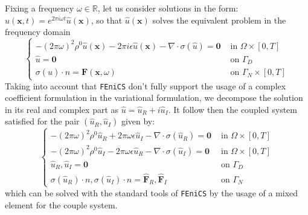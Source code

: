 Fixing a frequency $\omega \in \mathbb{R}$, let us consider solutions in the form: $u(\mathbf{x},t) = e^{2 \pi i \omega t}\hat{u}(\mathbf{x})$, so that $\hat{u}(\mathbf{x})$ solves the equivalent problem in the frequency domain
\begin{equation*}
    \left \{
    \begin{array}{ccc}
        -(2\pi \omega)^2 \rho^0 \hat{u}(\mathbf{x}) - 2 \pi i \epsilon \hat{u}(\mathbf{x}) - \nabla \cdot \sigma(\hat{u}) = \mathbf{0} & \text{ in } \Omega \times [0,T] \\
        \hat{u} = \mathbf{0} & \text{ on } \Gamma_D\\
        \sigma(\hat{u}) \cdot n = \mathbf{F}(\mathbf{x}, \omega) & \text{ on }\Gamma_N \times [0,T]
    \end{array}
    \right .
\end{equation*}
Taking into account that \texttt{FEniCS} don't fully support the usage of a complex coefficient formulation in the variational formulation, we decompose the solution in its real and complex part as $\hat{u} = \hat{u}_R + i \hat{u}_I$. It follow then the coupled system satisfied for the pair $(\hat{u}_R, \hat{u}_I)$ given by:
\begin{equation*}
    \left \{
    \begin{array}{cc}
        -(2\pi \omega)^2 \rho^0 \hat{u}_R + 2\pi \omega \epsilon \hat{u}_I - \nabla \cdot \sigma (\hat{u}_R) = \mathbf{0} & \text{ in }\Omega \times [0,T] \\
        -(2\pi \omega)^2 \rho^0 \hat{u}_I - 2\pi \omega \epsilon \hat{u}_R - \nabla \cdot \sigma (\hat{u}_I) = \mathbf{0} & \text{ in }\Omega \times [0, T] \\
        \hat{u}_R, \hat{u}_I = \mathbf{0} & \text{ on } \Gamma_D \\
        \sigma(\hat{u}_R)\cdot n, \sigma(\hat{u}_I)\cdot n = \hat{\mathbf{F}}_R, \hat{\mathbf{F}}_I & \text{ on }\Gamma_N
    \end{array}
    \right.
\end{equation*}
which can be solved with the standard tools of \texttt{FEniCS} by the usage of a mixed element for the couple system.
